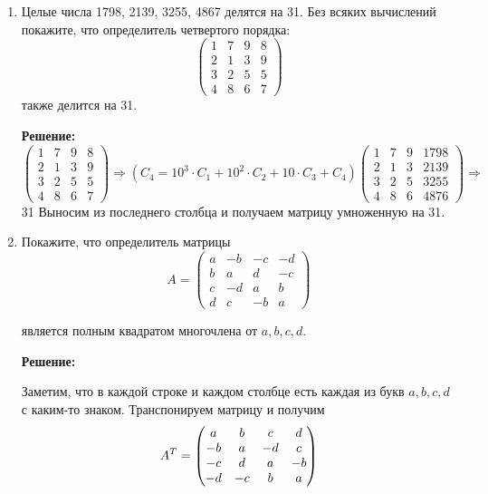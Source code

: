 \documentclass[]{book}
\theoremstyle{definition}
\newcommand{\tr}{\small{T}}
\begin{document}
\begin{enumerate}[resume]

\item Целые числа 1798, 2139, 3255, 4867 делятся на 31. Без всяких вычислений покажите, что определитель четвертого порядка:
$$
\begin{pmatrix} 
1 & 7 & 9 & 8 \\
2 & 1 & 3 & 9 \\
3 & 2 & 5 & 5 \\
4 & 8 & 6 & 7 
\end{pmatrix} $$
также делится на 31.

\textbf{Решение:}\\
$
\begin{pmatrix} 
1 & 7 & 9 & 8 \\
2 & 1 & 3 & 9 \\
3 & 2 & 5 & 5 \\
4 & 8 & 6 & 7 
\end{pmatrix} \Rightarrow (C_4=10^3\cdot C_1 + 10^2\cdot C_2 + 10\cdot C_3 + C_4)
\begin{pmatrix} 
1 & 7 & 9 & 1798 \\
2 & 1 & 3 & 2139 \\
3 & 2 & 5 & 3255 \\
4 & 8 & 6 & 4876 
\end{pmatrix} \Rightarrow$\\

31 Выносим из последнего столбца и получаем матрицу умноженную на 31.

\item Покажите, что определитель матрицы 
$$ A = 
\begin{pmatrix}
a & -b & -c & -d \\
b & a & d & -c \\
c & -d & a & b \\
d & c& -b & a 
\end{pmatrix}
$$

является полным квадратом многочлена от $a, b, c ,d$.

\textbf{Решение:}

Заметим, что в каждой строке и каждом столбце есть каждая из букв $a, b, c, d$ с каким-то знаком. Транспонируем матрицу и получим
$$
A^{\tr} = 
\begin{pmatrix}
a & b & c & d \\
-b & a & -d & c \\
-c & d & a & -b \\
-d & -c& b & a 
\end{pmatrix}
$$


\end{enumerate}
\end{document}
